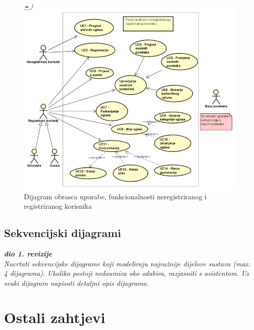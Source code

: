\begin{figure}[H]
	\includegraphics[width=\textwidth]{Dijagram_obrasca_uporabe.JPEG} %
	\caption{Dijagram obrasca uporabe, funkcionalnosti neregistriranog i registriranog korisnika}
	\label{fig:promjene2} %
\end{figure}

\subsection{Sekvencijski dijagrami}

\textbf{\textit{dio 1. revizije}}\\

\textit{Nacrtati sekvencijske dijagrame koji modeliraju najvažnije dijelove sustava (max. 4 dijagrama). Ukoliko postoji nedoumica oko odabira, razjasniti s asistentom. Uz svaki dijagram napisati detaljni opis dijagrama.}
\eject

\section{Ostali zahtjevi}



